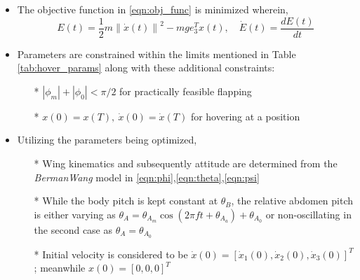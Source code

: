 \documentclass[10pt]{article}
\newcommand{\norm}[1]{\ensuremath{\left\| #1 \right\|}}
\begin{document}
\begin{itemize}
	\item The objective function in \eqref{eqn:obj_func} is minimized wherein,
	\[ E(t) = \frac{1}{2} m \norm{\dot x(t)}^2 - mge_3^T x(t), \quad \dot{E}(t) = \frac{d E(t)}{d t} \]
	\item Parameters are constrained within the limits mentioned in Table \ref{tab:hover_params} along with these additional constraints:
	\begin{itemize}
		\item[*] $ |\phi_m| + |\phi_0| < \pi/2 $ for practically feasible flapping
		\item[*] $ x(0) = x(T),\ \dot{x}(0) = \dot{x}(T) $ for hovering at a position
	\end{itemize}
	\item Utilizing the parameters being optimized,
	\begin{itemize}
		\item[*] Wing kinematics and subsequently attitude are determined from the \textit{BermanWang} model in \eqref{eqn:phi},\eqref{eqn:theta},\eqref{eqn:psi}
		\item[*] While the body pitch is kept constant at $ \theta_B $, the relative abdomen pitch is either varying as $ \theta_A = \theta_{A_m} \cos{(2 \pi f t + \theta_{A_a})} + \theta_{A_0} $ or non-oscillating in the second case as $ \theta_A = \theta_{A_0} $
		\item[*] Initial velocity is considered to be $ \dot{x}(0) = [\dot{x}_1(0), \dot{x}_2(0), \dot{x}_3(0)]^T $; meanwhile $ x(0) = [0, 0, 0]^T $
	\end{itemize}
\end{itemize}
\end{document}
